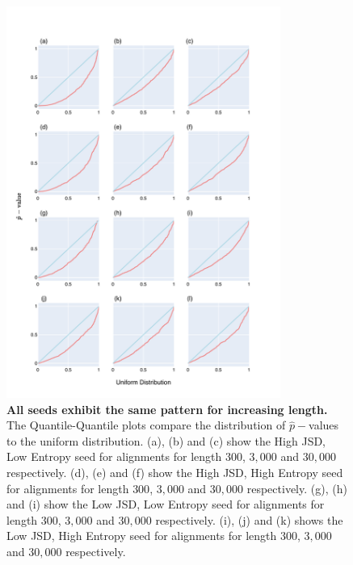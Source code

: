 \begin{figure}[!ht]
\centering
\includegraphics[width=0.8\textwidth]{figures/plots/synthetic/lrt/all-seeds.pdf}
\caption[All seeds exhibit the same pattern for TOE for increasing length.]{\textbf{All seeds exhibit the same pattern for increasing length.} The Quantile-Quantile plots compare the distribution of $\hat p-$values to the uniform distribution. (a), (b) and (c) show the High JSD, Low Entropy seed for alignments for length $300$, $3,000$ and $30,000$ respectively. (d), (e) and (f) show the High JSD, High Entropy seed for alignments for length $300$, $3,000$ and $30,000$ respectively. (g), (h) and (i) show the Low JSD, Low Entropy seed for alignments for length $300$, $3,000$ and $30,000$ respectively. (i), (j) and (k) shows the Low JSD, High Entropy seed for alignments for length $300$, $3,000$ and $30,000$ respectively.
}
\label{fig:synthetic/lrt/all-seeds}
\end{figure}